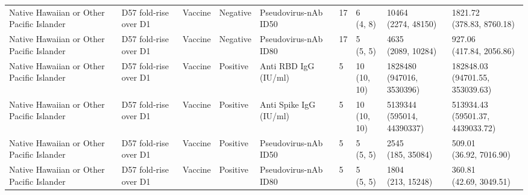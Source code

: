 \documentclass[]{book}
\theoremstyle{definition}
\theoremstyle{definition}
\theoremstyle{definition}
\newcommand{\1}{\mathbbm{1}}
\begin{document}
\begin{landscape}
\begin{ThreePartTable}
\begin{longtable}[t]{>{\raggedright\arraybackslash}p{2.7cm}llllllll}
\hspace{1em}Native Hawaiian or Other Pacific Islander & D57 fold-rise over D1 & Vaccine & Negative & Pseudovirus-nAb ID50 & 17 & \makecell[l]{6\\(4, 8)} & \makecell[l]{10464\\(2274, 48150)} & \makecell[l]{1821.72\\(378.83, 8760.18)}\\
\hspace{1em}Native Hawaiian or Other Pacific Islander & D57 fold-rise over D1 & Vaccine & Negative & Pseudovirus-nAb ID80 & 17 & \makecell[l]{5\\(5, 5)} & \makecell[l]{4635\\(2089, 10284)} & \makecell[l]{927.06\\(417.84, 2056.86)}\\
\hspace{1em}Native Hawaiian or Other Pacific Islander & D57 fold-rise over D1 & Vaccine & Positive & Anti RBD IgG (IU/ml) & 5 & \makecell[l]{10\\(10, 10)} & \makecell[l]{1828480\\(947016, 3530396)} & \makecell[l]{182848.03\\(94701.55, 353039.63)}\\
\hspace{1em}Native Hawaiian or Other Pacific Islander & D57 fold-rise over D1 & Vaccine & Positive & Anti Spike IgG (IU/ml) & 5 & \makecell[l]{10\\(10, 10)} & \makecell[l]{5139344\\(595014, 44390337)} & \makecell[l]{513934.43\\(59501.37, 4439033.72)}\\
\hspace{1em}Native Hawaiian or Other Pacific Islander & D57 fold-rise over D1 & Vaccine & Positive & Pseudovirus-nAb ID50 & 5 & \makecell[l]{5\\(5, 5)} & \makecell[l]{2545\\(185, 35084)} & \makecell[l]{509.01\\(36.92, 7016.90)}\\
\hspace{1em}Native Hawaiian or Other Pacific Islander & D57 fold-rise over D1 & Vaccine & Positive & Pseudovirus-nAb ID80 & 5 & \makecell[l]{5\\(5, 5)} & \makecell[l]{1804\\(213, 15248)} & \makecell[l]{360.81\\(42.69, 3049.51)}\\

\end{longtable}
\end{ThreePartTable}
\end{landscape}
\end{document}

